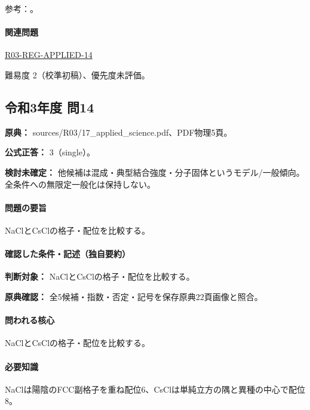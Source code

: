 \par 参考：\cite{openstax_crystals}。

\paragraph{関連問題} \hyperref[q:r03-reg-applied-14]{R03-REG-APPLIED-14}

\par 難易度 2（校準初稿）、優先度未評価。

\subsection{令和3年度 問14}
\label{q:r03-reg-applied-14}

\noindent\textbf{原典：} sources/R03/17\_applied\_science.pdf、PDF物理5頁。

\textbf{公式正答：} 3（single）。

\par\textbf{検討未確定：} 他候補は混成・典型結合強度・分子固体というモデル/一般傾向。全条件への無限定一般化は保持しない。

\paragraph{問題の要旨} NaClとCsClの格子・配位を比較する。

\paragraph{確認した条件・記述（独自要約）}\mbox{}\par

\noindent\textbf{判断対象：} NaClとCsClの格子・配位を比較する。\par

\noindent\textbf{原典確認：} 全5候補・指数・否定・記号を保存原典22頁画像と照合。\par

\paragraph{問われる核心} NaClとCsClの格子・配位を比較する。

\paragraph{必要知識} NaClは陽陰のFCC副格子を重ね配位6、CsClは単純立方の隅と異種の中心で配位8。

